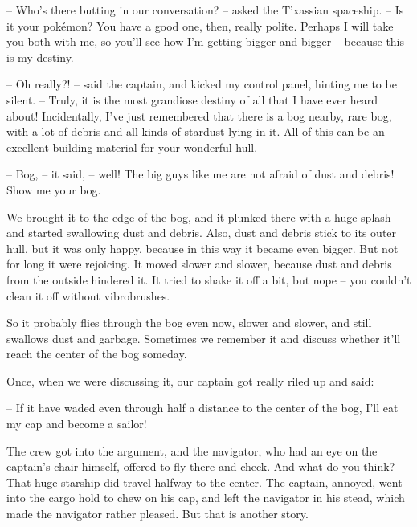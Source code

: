 \documentclass[ebook,twoside,final,openright]{memoir}
\begin{document}
– Who’s there butting in our conversation? – asked the T'xassian spaceship. – Is it your pokémon? You have a good one, then, really polite. Perhaps I will take you both with me, so you’ll see how I’m getting bigger and bigger – because this is my destiny.\par
– Oh really?! – said the captain, and kicked my control panel, hinting me to be silent. – Truly, it is the most grandiose destiny of all that I have ever heard about! Incidentally, I’ve just remembered that there is a bog nearby, rare bog, with a lot of debris and all kinds of stardust lying in it. All of this can be an excellent building material for your wonderful hull.\par
– Bog, – it said, – well! The big guys like me are not afraid of dust and debris! Show me your bog.\par
\par
We brought it to the edge of the bog, and it plunked there with a huge splash and started swallowing dust and debris. Also, dust and debris stick to its outer hull, but it was only happy, because in this way it became even bigger. But not for long it were rejoicing. It moved slower and slower, because dust and debris from the outside hindered it. It tried to shake it off a bit, but nope – you couldn’t clean it off without vibrobrushes.\par
\par
So it probably flies through the bog even now, slower and slower, and still swallows dust and garbage. Sometimes we remember it and discuss whether it’ll reach the center of the bog someday.\par
\par
Once, when we were discussing it, our captain got really riled up and said:\par
– If it have waded even through half a distance to the center of the bog, I’ll eat my cap and become a sailor!\par
\par
The crew got into the argument, and the navigator, who had an eye on the captain’s chair himself, offered to fly there and check. And what do you think? That huge starship did travel halfway to the center. The captain, annoyed, went into the cargo hold to chew on his cap, and left the navigator in his stead, which made the navigator rather pleased. But that is another story.
\end{document}
